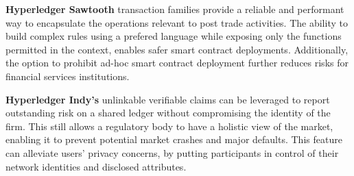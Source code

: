 \textbf{Hyperledger Sawtooth} transaction families provide a reliable and performant way to encapsulate the operations relevant to post trade activities. The ability to build complex rules using a prefered language while exposing only the functions permitted in the context, enables safer smart contract deployments. Additionally, the option to prohibit ad-hoc smart contract deployment further reduces risks for financial services institutions.

\textbf{Hyperledger Indy's} unlinkable verifiable claims can be leveraged to report outstanding risk on a shared ledger without compromising the identity of the firm. This still allows a regulatory body to have a holistic view of the market, enabling it to prevent potential market crashes and major defaults. This feature can alleviate users' privacy concerns, by putting participants in control of their network identities and disclosed attributes.
